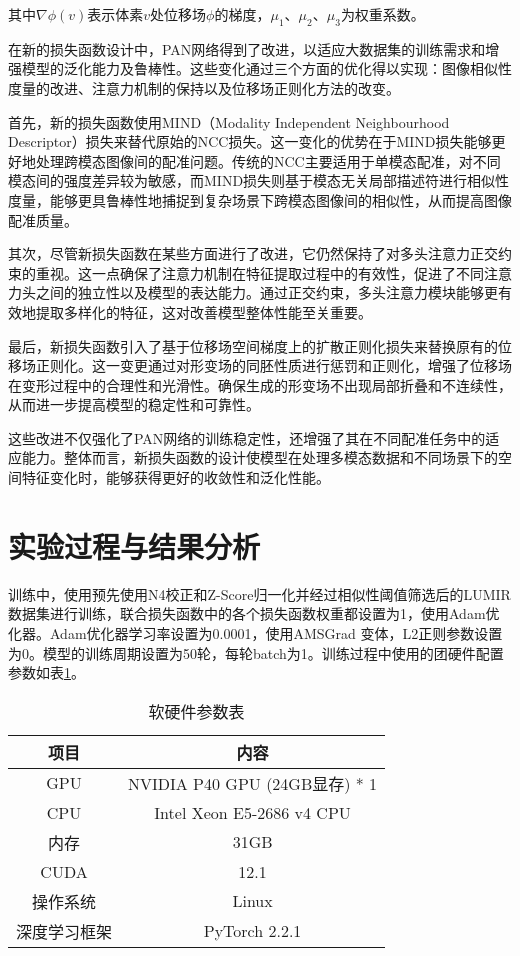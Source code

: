 其中$\nabla \phi(v)$表示体素$v$处位移场$\phi$的梯度，$\mu_1$、$\mu_2$、$\mu_3$为权重系数。

在新的损失函数设计中，PAN网络得到了改进，以适应大数据集的训练需求和增强模型的泛化能力及鲁棒性。这些变化通过三个方面的优化得以实现：图像相似性度量的改进、注意力机制的保持以及位移场正则化方法的改变。

首先，新的损失函数使用MIND（Modality Independent Neighbourhood Descriptor）损失来替代原始的NCC损失。这一变化的优势在于MIND损失能够更好地处理跨模态图像间的配准问题。传统的NCC主要适用于单模态配准，对不同模态间的强度差异较为敏感，而MIND损失则基于模态无关局部描述符进行相似性度量，能够更具鲁棒性地捕捉到复杂场景下跨模态图像间的相似性，从而提高图像配准质量。

其次，尽管新损失函数在某些方面进行了改进，它仍然保持了对多头注意力正交约束的重视。这一点确保了注意力机制在特征提取过程中的有效性，促进了不同注意力头之间的独立性以及模型的表达能力。通过正交约束，多头注意力模块能够更有效地提取多样化的特征，这对改善模型整体性能至关重要。

最后，新损失函数引入了基于位移场空间梯度上的扩散正则化损失来替换原有的位移场正则化。这一变更通过对形变场的同胚性质进行惩罚和正则化，增强了位移场在变形过程中的合理性和光滑性。确保生成的形变场不出现局部折叠和不连续性，从而进一步提高模型的稳定性和可靠性。

这些改进不仅强化了PAN网络的训练稳定性，还增强了其在不同配准任务中的适应能力。整体而言，新损失函数的设计使模型在处理多模态数据和不同场景下的空间特征变化时，能够获得更好的收敛性和泛化性能。

\section{实验过程与结果分析}

训练中，使用预先使用N4校正和Z-Score归一化并经过相似性阈值筛选后的LUMIR数据集进行训练，联合损失函数中的各个损失函数权重都设置为1，使用Adam优化器。Adam优化器学习率设置为0.0001，使用AMSGrad 变体，L2正则参数设置为0。模型的训练周期设置为50轮，每轮batch为1。训练过程中使用的团硬件配置参数如表\ref{tab:environment}。

\begin{table}[ht]
    \centering
    \caption{软硬件参数表}
    \begin{tabular}{c c}
        \toprule
        \textbf{项目} & \textbf{内容}                 \\
        \midrule
        GPU         & NVIDIA P40 GPU (24GB显存) * 1 \\
        CPU         & Intel Xeon E5-2686 v4 CPU   \\
        内存          & 31GB                        \\
        CUDA        & 12.1                        \\
        操作系统        & Linux                       \\
        深度学习框架      & PyTorch 2.2.1               \\
        \bottomrule
    \end{tabular}
    \label{tab:environment}
\end{table}

